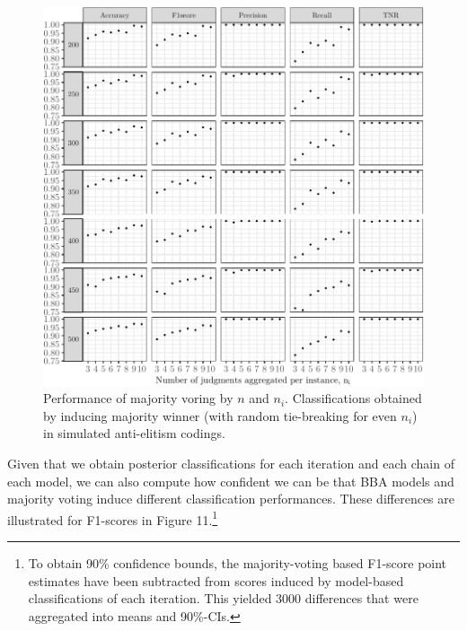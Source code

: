 \documentclass[12pt,]{article}
\begin{document}
\begin{figure}[H]

{\centering \includegraphics{licht_2019_evaluating_crowdsourced_elite_critique_codings_files/figure-latex/sim_vote_performance-1} 

}

\caption{Performance of majority voring by $n$ and $n_i$. Classifications obtained by inducing majority winner (with random tie-breaking for even $n_i$) in simulated anti-elitism codings.}\label{fig:sim_vote_performance}
\end{figure}

Given that we obtain posterior classifications for each iteration and
each chain of each model, we can also compute how confident we can be
that BBA models and majority voting induce different classification
performances. These differences are illustrated for F1-scores in Figure
11.\footnote{To obtain 90\% confidence bounds, the majority-voting based
  F1-score point estimates have been subtracted from scores induced by
  model-based classifications of each iteration. This yielded 3000
  differences that were aggregated into means and 90\%-CIs.}
\end{document}
